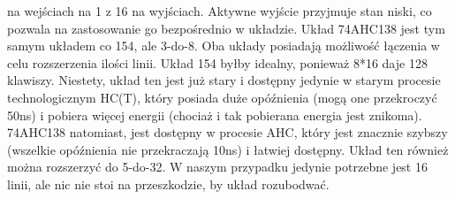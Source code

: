 \documentclass{article}
\begin{document}
    na wejściach na 1 z 16 na wyjściach. Aktywne wyjście przyjmuje stan niski, co pozwala na zastosowanie go bezpośrednio w układzie.
    Układ 74AHC138 jest tym samym układem co 154, ale 3-do-8. Oba układy posiadają możliwość łączenia w celu rozszerzenia
    ilości linii. Układ 154 byłby idealny, ponieważ 8*16 daje 128 klawiszy. Niestety, układ ten jest już stary 
    i dostępny jedynie w starym procesie technologicznym HC(T), który posiada duże opóźnienia (mogą one przekroczyć 
    50ns) i pobiera więcej energii (chociaż i tak pobierana energia jest znikoma). 74AHC138 natomiast, jest dostępny
    w procesie AHC, który jest znacznie szybszy (wszelkie opóźnienia nie przekraczają 10ns) i łatwiej dostępny.
    Układ ten również można rozszerzyć do 5-do-32. W naszym przypadku jedynie potrzebne jest 16 linii, ale nic nie
    stoi na przeszkodzie, by układ rozubodwać.
\end{document}

